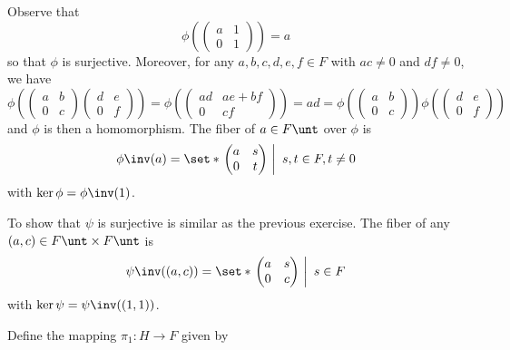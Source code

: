 \begin{solenum}
    \item Observe that
    \[
    	\phi\left(
        \begin{pmatrix}
            a & 1 \\
            0 & 1
        \end{pmatrix}\right) = a
	\]
    so that $\phi$ is surjective.
	Moreover, for any $a, b, c, d, e, f \in F$ with $ac \neq 0$ and $df \neq 0$, we have
    \[
    	\phi\left(
        \begin{pmatrix}
            a & b \\
            0 & c
        \end{pmatrix}
        \begin{pmatrix}
            d & e \\
            0 & f
        \end{pmatrix}\right) = 
        \phi\left(
        \begin{pmatrix}
            ad & ae + bf \\
            0 & cf
        \end{pmatrix}\right) = ad = 
        \phi\left(
        \begin{pmatrix}
            a & b \\
            0 & c
        \end{pmatrix}\right)
        \phi\left(
        \begin{pmatrix}
            d & e \\
            0 & f
        \end{pmatrix}\right)
	\]
    and $\phi$ is then a homomorphism.
	The fiber of $a \in F\unt$ over $\phi$ is
    \[
    	\phi\inv(a) = 
        \set*{\left.
        \begin{pmatrix}
            a & s \\
            0 & t
        \end{pmatrix}~\right|~s, t \in F, t \neq 0}
	\]
    with $\ker\phi = \phi\inv(1)$.
    \item To show that $\psi$ is surjective is similar as the previous exercise.
	The fiber of any $(a, c) \in F\unt \times F\unt$ is
    \[
    	\psi\inv((a, c)) = 
        \set*{\left.
        \begin{pmatrix}
            a & s \\
            0 & c
        \end{pmatrix}~\right|~s \in F}
	\]
    with $\ker\psi = \psi\inv((1, 1))$.
    \item Define the mapping $\pi_1 : H \to F$ given by

\end{solenum}

